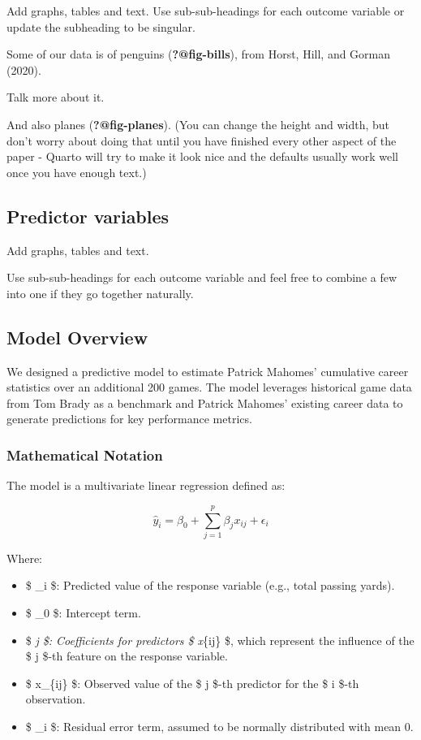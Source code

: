 \documentclass[
  letterpaper,
  DIV=11,
  numbers=noendperiod]{scrartcl}
\providecommand{\tightlist}{%
  \setlength{\itemsep}{0pt}\setlength{\parskip}{0pt}}\usepackage{longtable,booktabs,array}
\begin{document}
Add graphs, tables and text. Use sub-sub-headings for each outcome
variable or update the subheading to be singular.

Some of our data is of penguins (\textbf{?@fig-bills}), from Horst,
Hill, and Gorman (2020).

Talk more about it.

And also planes (\textbf{?@fig-planes}). (You can change the height and
width, but don't worry about doing that until you have finished every
other aspect of the paper - Quarto will try to make it look nice and the
defaults usually work well once you have enough text.)

\subsection{Predictor variables}\label{predictor-variables}

Add graphs, tables and text.

Use sub-sub-headings for each outcome variable and feel free to combine
a few into one if they go together naturally.

\subsection{Model Overview}\label{model-overview}

We designed a predictive model to estimate Patrick Mahomes' cumulative
career statistics over an additional 200 games. The model leverages
historical game data from Tom Brady as a benchmark and Patrick Mahomes'
existing career data to generate predictions for key performance
metrics.

\subsubsection{Mathematical Notation}\label{mathematical-notation}

The model is a multivariate linear regression defined as:

\[
\hat{y}_i = \beta_0 + \sum_{j=1}^p \beta_j x_{ij} + \epsilon_i
\]

Where:

\begin{itemize}
\tightlist
\item
  \$ \_i \$: Predicted value of the response variable (e.g.,
  total passing yards).\\
\item
  \$ \beta\_0 \$: Intercept term.\\
\item
  \$ \beta\emph{j \$: Coefficients for predictors \$ x}\{ij\} \$, which
  represent the influence of the \$ j \$-th feature on the response
  variable.\\
\item
  \$ x\_\{ij\} \$: Observed value of the \$ j \$-th predictor for the \$
  i \$-th observation.\\
\item
  \$ \epsilon\_i \$: Residual error term, assumed to be normally
  distributed with mean 0.
\end{itemize}
\end{document}
